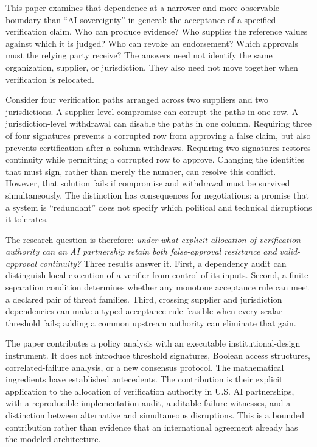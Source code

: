 \documentclass[11pt,letterpaper]{article}
\begin{document}
This paper examines that dependence at a narrower and more observable boundary than ``AI sovereignty'' in general: the acceptance of a specified verification claim. Who can produce evidence? Who supplies the reference values against which it is judged? Who can revoke an endorsement? Which approvals must the relying party receive? The answers need not identify the same organization, supplier, or jurisdiction. They also need not move together when verification is relocated.

Consider four verification paths arranged across two suppliers and two jurisdictions. A supplier-level compromise can corrupt the paths in one row. A jurisdiction-level withdrawal can disable the paths in one column. Requiring three of four signatures prevents a corrupted row from approving a false claim, but also prevents certification after a column withdraws. Requiring two signatures restores continuity while permitting a corrupted row to approve. Changing the identities that must sign, rather than merely the number, can resolve this conflict. However, that solution fails if compromise and withdrawal must be survived simultaneously. The distinction has consequences for negotiations: a promise that a system is ``redundant'' does not specify which political and technical disruptions it tolerates.

The research question is therefore: \emph{under what explicit allocation of verification authority can an AI partnership retain both false-approval resistance and valid-approval continuity?} Three results answer it. First, a dependency audit can distinguish local execution of a verifier from control of its inputs. Second, a finite separation condition determines whether any monotone acceptance rule can meet a declared pair of threat families. Third, crossing supplier and jurisdiction dependencies can make a typed acceptance rule feasible when every scalar threshold fails; adding a common upstream authority can eliminate that gain.

The paper contributes a policy analysis with an executable institutional-design instrument. It does not introduce threshold signatures, Boolean access structures, correlated-failure analysis, or a new consensus protocol. The mathematical ingredients have established antecedents. The contribution is their explicit application to the allocation of verification authority in U.S. AI partnerships, with a reproducible implementation audit, auditable failure witnesses, and a distinction between alternative and simultaneous disruptions. This is a bounded contribution rather than evidence that an international agreement already has the modeled architecture.
\end{document}
